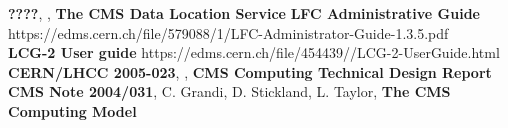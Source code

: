 \documentclass[pdftex]{cmspaper}
\begin{document}

\begin{thebibliography}{9}
   {\bf ????}, , {\bf The CMS Data Location Service} 
   {\bf LFC Administrative Guide} https://edms.cern.ch/file/579088/1/LFC-Administrator-Guide-1.3.5.pdf \\ {\bf LCG-2 User guide } https://edms.cern.ch/file/454439//LCG-2-UserGuide.html 
   {\bf CERN/LHCC 2005-023}, , {\bf CMS Computing Technical Design Report}
   {\bf CMS Note 2004/031}, C. Grandi, D. Stickland,
               L. Taylor, {\bf The CMS Computing Model}

\end{thebibliography}
 
\pagebreak
\end{document}
